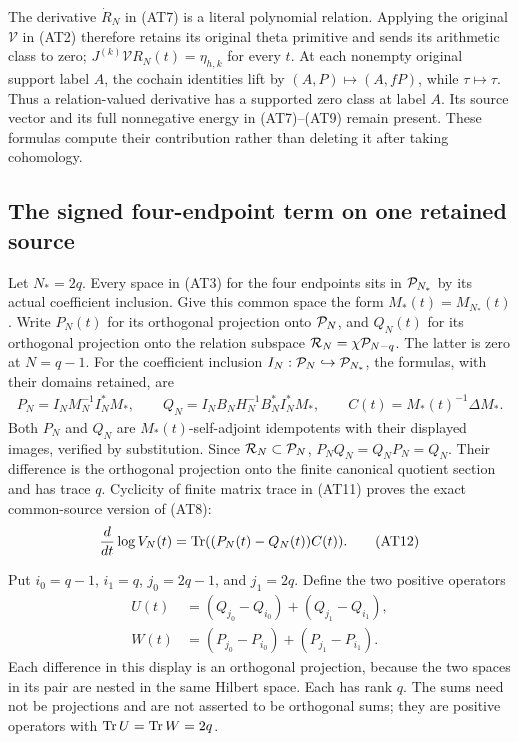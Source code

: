 The derivative $\dot R_N$ in (AT7) is a literal polynomial relation.
Applying the original $\mathcal V$ in (AT2) therefore retains its
original theta primitive and sends its arithmetic class to zero;
$J^{(k)}\mathcal V R_N(t)=\eta_{h,k}$ for every $t$.
At each nonempty original support label $A$, the cochain identities
lift by $(A,P)\mapsto(A,fP)$, while $\tau\mapsto\tau$.
Thus a relation-valued derivative has a supported zero class at
label $A$. Its source vector and its full nonnegative energy in
(AT7)--(AT9) remain present. These formulas compute their
contribution rather than deleting it after taking cohomology.

\subsection{The signed four-endpoint term on one retained source}

Let $N_*=2q$. Every space in (AT3) for the four endpoints sits in
$\mathcal P_{N_*}$ by its actual coefficient inclusion. Give this common
space the form $M_*(t)=M_{N_*}(t)$. Write $P_N(t)$ for its
orthogonal projection onto $\mathcal P_N$, and $Q_N(t)$ for its
orthogonal projection onto the relation subspace
$\mathcal R_N=\chi\mathcal P_{N-q}$. The latter is zero at $N=q-1$.
For the coefficient inclusion $I_N:\mathcal P_N\hookrightarrow\mathcal P_{N_*}$,
the formulas, with their domains retained, are
\[
 \begin{gathered}
 P_N=I_NM_N^{-1}I_N^*M_*,\qquad
 Q_N=I_NB_NH_N^{-1}B_N^*I_N^*M_*,\qquad
 C(t)=M_*(t)^{-1}\Delta M_*.                   \end{gathered}
 \tag{AT11}
\]
Both $P_N$ and $Q_N$ are $M_*(t)$-self-adjoint idempotents with
their displayed images, verified by substitution. Since
$\mathcal R_N\subset\mathcal P_N$, $P_NQ_N=Q_NP_N=Q_N$. Their difference is
the orthogonal projection onto the finite canonical quotient
section and has trace $q$. Cyclicity of finite matrix trace in
(AT11) proves the exact common-source version of (AT8):
\[
 \frac{d}{dt}\log V_N(t)=\operatorname{Tr}((P_N(t)-Q_N(t))C(t)).
                                                        \tag{AT12}
\]

Put $i_0=q-1$, $i_1=q$, $j_0=2q-1$, and $j_1=2q$.
Define the two positive operators
\[
 \begin{split}
 U(t)&=(Q_{j_0}-Q_{i_0})+(Q_{j_1}-Q_{i_1}),\\
 W(t)&=(P_{j_0}-P_{i_0})+(P_{j_1}-P_{i_1}).    \end{split}
 \tag{AT13}
\]
Each difference in this display is an orthogonal projection,
because the two spaces in its pair are nested in the same
Hilbert space. Each has rank $q$. The sums need not be
projections and are not asserted to be orthogonal sums; they
are positive operators with $\operatorname{Tr} U=\operatorname{Tr} W=2q$.


